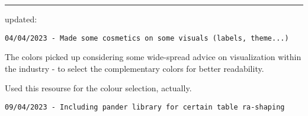\documentclass[
]{article}
\begin{document}
\begin{center}\rule{0.5\linewidth}{0.5pt}\end{center}

updated:

\begin{verbatim}
04/04/2023 - Made some cosmetics on some visuals (labels, theme...)
\end{verbatim}

The colors picked up considering some wide-spread advice on
visualization within the industry - to select the complementary colors
for better readability.

Used this resourse for the colour selection, actually.

\begin{verbatim}
09/04/2023 - Including pander library for certain table ra-shaping
\end{verbatim}
\end{document}
